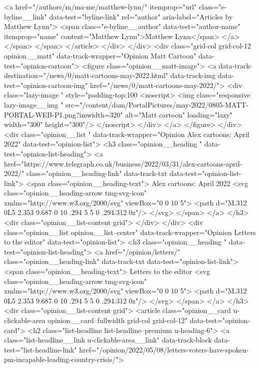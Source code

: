 {{{<a href="/authors/m/ma-me/matthew-lynn/" itemprop="url" class="e-byline__link" data-test="byline-link" rel="author" aria-label="Articles by Matthew Lynn">
<span class="e-byline__author" data-test="author-name" itemprop="name" content="Matthew Lynn">Matthew Lynn</span>
</a>
</span>
</span>
</article>
</div>
</div>
<div class="grid-col grid-col-12 opinion__matt" data-track-wrapper="Opinion Matt Cartoon" data-test="opinion-cartoon">
<figure class="opinion__matt-image">
<a data-track-destination="/news/0/matt-cartoons-may-2022.html" data-track-img data-test="opinion-cartoon-img" href="/news/0/matt-cartoons-may-2022/">
<div class="lazy-image   " style="padding-top:100%
<noscript>
<img class="responsive lazy-image__img " src="/content/dam/PortalPictures/may-2022/0805-MATT-PORTAL-WEB-P1.png?imwidth=320" alt="Matt cartoon" loading="lazy" width="300" height="300"/>
</noscript>
</div>
</a>
</figure>
</div>
<div class="opinion__list " data-track-wrapper="Opinion Alex cartoons: April 2022" data-test="opinion-list">
<h3 class="opinion__heading " data-test="opinion-list-heading">
<a href="https://www.telegraph.co.uk/business/2022/03/31/alex-cartoons-april-2022/" class="opinion__heading-link" data-track-txt data-test="opinion-list-link">
<span class="opinion__heading-text">
Alex cartoons: April 2022
<svg class="opinion__heading-arrow  tmg-svg-icon" xmlns="http://www.w3.org/2000/svg" viewBox="0 0 10 5">
<path d="M.312 0L5 2.353 9.687 0 10 .294 5 5 0 .294.312 0z"/>
</svg>
</span>
</a>
</h3>
<div class="opinion__list-content grid">
</div>
</div>
<div class="opinion__list opinion__list--center" data-track-wrapper="Opinion Letters to the editor" data-test="opinion-list">
<h3 class="opinion__heading " data-test="opinion-list-heading">
<a href="/opinion/letters/" class="opinion__heading-link" data-track-txt data-test="opinion-list-link">
<span class="opinion__heading-text">
Letters to the editor
<svg class="opinion__heading-arrow  tmg-svg-icon" xmlns="http://www.w3.org/2000/svg" viewBox="0 0 10 5">
<path d="M.312 0L5 2.353 9.687 0 10 .294 5 5 0 .294.312 0z"/>
</svg>
</span>
</a>
</h3>
<div class="opinion__list-content grid">
<article class="opinion__card u-clickable-area opinion__card--fullwidth grid-col grid-col-12" data-test="opinion-card">
<h2 class="list-headline list-headline--premium u-heading-6">
<a class="list-headline__link u-clickable-area__link" data-track-block data-test="list-headline-link" href="/opinion/2022/05/08/letters-voters-have-spoken-pm-incapable-leading-country-crisis/">
}}}
